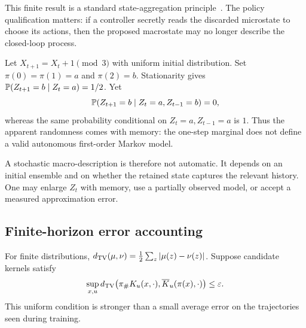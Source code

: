 This finite result is a standard state-aggregation principle~\cite{MS:givan}. The policy qualification matters: if a controller secretly reads the discarded microstate to choose its actions, then the proposed macrostate may no longer describe the closed-loop process.

\begin{MScounterexample}\label{MS:ex:cycle}
Let $X_{t+1}=X_t+1\pmod 3$ with uniform initial distribution. Set $\pi(0)=\pi(1)=a$ and $\pi(2)=b$. Stationarity gives $\mathbb P(Z_{t+1}=b\mid Z_t=a)=1/2$. Yet
\[
\mathbb P(Z_{t+1}=b\mid Z_t=a,Z_{t-1}=b)=0,
\]
whereas the same probability conditional on $Z_t=a,Z_{t-1}=a$ is $1$. Thus the apparent randomness comes with memory: the one-step marginal does not define a valid autonomous first-order Markov model.
\end{MScounterexample}

A stochastic macro-description is therefore not automatic. It depends on an initial ensemble and on whether the retained state captures the relevant history. One may enlarge $Z_t$ with memory, use a partially observed model, or accept a measured approximation error.

\subsection{Finite-horizon error accounting}
For finite distributions, $d_{\mathrm{TV}}(\mu,\nu)=\tfrac12\sum_z|\mu(z)-\nu(z)|$. Suppose candidate kernels satisfy
\begin{equation}\label{MS:eq:eps}
\sup_{x,u}d_{\mathrm{TV}}\bigl(\pi_{\#} K_u(x,\cdot),\overline K_u(\pi(x),\cdot)\bigr)
\leq\varepsilon.
\end{equation}
This uniform condition is stronger than a small average error on the trajectories seen during training.

